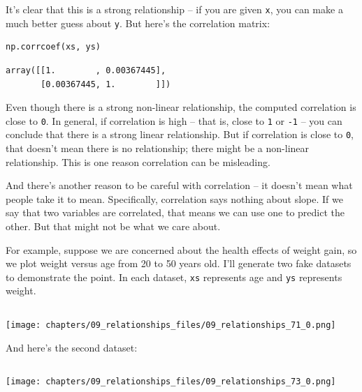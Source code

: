 It's clear that this is a strong relationship -- if you are given
\passthrough{\lstinline!x!}, you can make a much better guess about
\passthrough{\lstinline!y!}. But here's the correlation matrix:

\begin{lstlisting}[language=Python,style=source]
np.corrcoef(xs, ys)
\end{lstlisting}

\begin{lstlisting}[style=output]
array([[1.        , 0.00367445],
       [0.00367445, 1.        ]])
\end{lstlisting}

Even though there is a strong non-linear relationship, the computed
correlation is close to \passthrough{\lstinline!0!}. In general, if
correlation is high -- that is, close to \passthrough{\lstinline!1!} or
\passthrough{\lstinline!-1!} -- you can conclude that there is a strong
linear relationship. But if correlation is close to
\passthrough{\lstinline!0!}, that doesn't mean there is no relationship;
there might be a non-linear relationship. This is one reason correlation
can be misleading.

And there's another reason to be careful with correlation -- it doesn't
mean what people take it to mean. Specifically, correlation says nothing
about slope. If we say that two variables are correlated, that means we
can use one to predict the other. But that might not be what we care
about.

For example, suppose we are concerned about the health effects of weight
gain, so we plot weight versus age from 20 to 50 years old. I'll
generate two fake datasets to demonstrate the point. In each dataset,
\passthrough{\lstinline!xs!} represents age and
\passthrough{\lstinline!ys!} represents weight.

\begin{lstlisting}[language=Python,style=source]
\end{lstlisting}

\begin{center}
\texttt{[image: chapters/09\_relationships\_files/09\_relationships\_71\_0.png]}
\end{center}

And here's the second dataset:

\begin{lstlisting}[language=Python,style=source]
\end{lstlisting}

\begin{center}
\texttt{[image: chapters/09\_relationships\_files/09\_relationships\_73\_0.png]}
\end{center}

